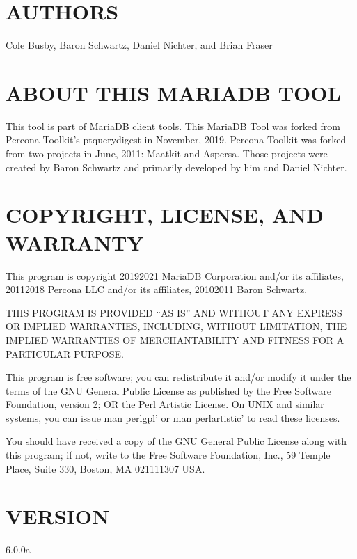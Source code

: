 \documentclass[letterpaper,10pt,english]{sphinxmanual}
\begin{document}
\section{AUTHORS}
\label{\detokenize{mariadb-query-digest:authors}}
Cole Busby, Baron Schwartz, Daniel Nichter, and Brian Fraser


\section{ABOUT THIS MARIADB TOOL}
\label{\detokenize{mariadb-query-digest:about-this-mariadb-tool}}
This tool is part of MariaDB client tools. This MariaDB Tool was forked from
Percona Toolkit’s pt\sphinxhyphen{}query\sphinxhyphen{}digest in November, 2019.  Percona Toolkit was
forked from two projects in June, 2011: Maatkit and Aspersa.  Those projects
were created by Baron Schwartz and primarily developed by him and Daniel
Nichter.


\section{COPYRIGHT, LICENSE, AND WARRANTY}
\label{\detokenize{mariadb-query-digest:copyright-license-and-warranty}}
This program is copyright 2019\sphinxhyphen{}2021 MariaDB Corporation and/or its affiliates,
2011\sphinxhyphen{}2018 Percona LLC and/or its affiliates, 2010\sphinxhyphen{}2011 Baron Schwartz.

THIS PROGRAM IS PROVIDED “AS IS” AND WITHOUT ANY EXPRESS OR IMPLIED
WARRANTIES, INCLUDING, WITHOUT LIMITATION, THE IMPLIED WARRANTIES OF
MERCHANTABILITY AND FITNESS FOR A PARTICULAR PURPOSE.

This program is free software; you can redistribute it and/or modify it under
the terms of the GNU General Public License as published by the Free Software
Foundation, version 2; OR the Perl Artistic License.  On UNIX and similar
systems, you can issue \textasciigrave{}man perlgpl’ or \textasciigrave{}man perlartistic’ to read these
licenses.

You should have received a copy of the GNU General Public License along with
this program; if not, write to the Free Software Foundation, Inc., 59 Temple
Place, Suite 330, Boston, MA  02111\sphinxhyphen{}1307  USA.


\section{VERSION}
\label{\detokenize{mariadb-query-digest:version}}
 6.0.0a
\end{document}
